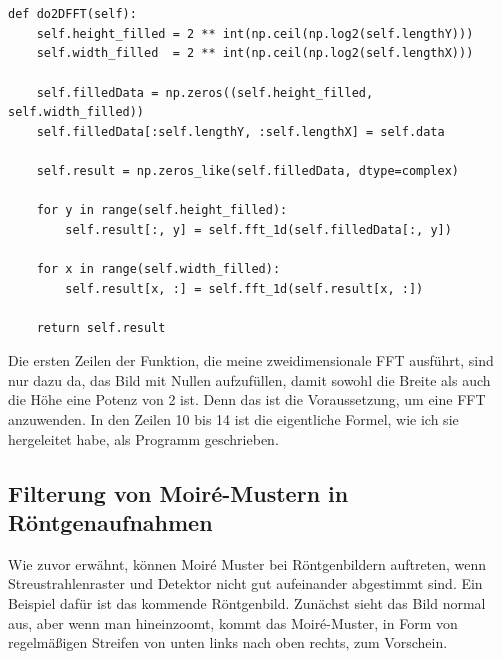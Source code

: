 \documentclass[a4paper,12pt]{article}
\theoremstyle{definition}
\theoremstyle{remark}
\begin{document}
\\\\
\begin{lstlisting}[style=pythonstyle]
def do2DFFT(self):
    self.height_filled = 2 ** int(np.ceil(np.log2(self.lengthY)))
    self.width_filled  = 2 ** int(np.ceil(np.log2(self.lengthX)))

    self.filledData = np.zeros((self.height_filled, self.width_filled))
    self.filledData[:self.lengthY, :self.lengthX] = self.data

    self.result = np.zeros_like(self.filledData, dtype=complex)

    for y in range(self.height_filled):
        self.result[:, y] = self.fft_1d(self.filledData[:, y])
    
    for x in range(self.width_filled):
        self.result[x, :] = self.fft_1d(self.result[x, :])

    return self.result
\end{lstlisting}

Die ersten Zeilen der Funktion, die meine zweidimensionale FFT ausführt, sind nur dazu da, das Bild mit Nullen aufzufüllen, damit sowohl 
die Breite als auch die Höhe eine Potenz von 2 ist. Denn das ist die Voraussetzung, um eine FFT anzuwenden. In den Zeilen 10 bis 14 ist die eigentliche Formel, wie ich sie 
hergeleitet habe, als Programm geschrieben.  

\subsection{Filterung von Moiré-Mustern in Röntgenaufnahmen}
Wie zuvor erwähnt, können Moiré Muster bei Röntgenbildern auftreten, wenn Streustrahlenraster und Detektor nicht gut aufeinander abgestimmt sind. Ein Beispiel 
dafür ist das kommende Röntgenbild. Zunächst sieht das Bild normal aus, aber wenn man hineinzoomt, kommt das Moiré-Muster, in Form von regelmäßigen Streifen von 
unten links nach oben rechts, zum Vorschein. 
\end{document}
